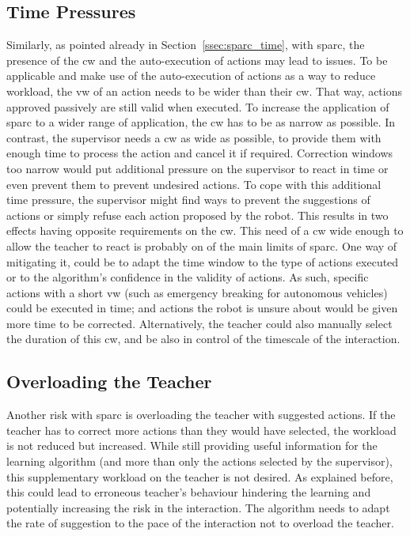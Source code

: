 \subsection{Time Pressures}
Similarly, as pointed already in Section~\ref{ssec:sparc_time}, with \gls{sparc}, the presence of the \gls{cw} and the auto-execution of actions may lead to issues. To be applicable and make use of the auto-execution of actions as a way to reduce workload, the \gls{vw} of an action needs to be wider than their \gls{cw}. That way, actions approved passively are still valid when executed. To increase the application of \gls{sparc} to a wider range of application, the \gls{cw} has to be as narrow as possible. In contrast, the supervisor needs a \gls{cw} as wide as possible, to provide them with enough time to process the action and cancel it if required. Correction windows too narrow would put additional pressure on the supervisor to react in time or even prevent them to prevent undesired actions. To cope with this additional time pressure, the supervisor might find ways to prevent the suggestions of actions or simply refuse each action proposed by the robot. This results in two effects having opposite requirements on the \gls{cw}. This need of a \gls{cw} wide enough to allow the teacher to react is probably on of the main limits of \gls{sparc}. One way of mitigating it, could be to adapt the time window to the type of actions executed or to the algorithm's confidence in the validity of actions. As such, specific actions with a short \gls{vw} (such as emergency breaking for autonomous vehicles) could be executed in time; and actions the robot is unsure about would be given more time to be corrected. Alternatively, the teacher could also manually select the duration of this \gls{cw}, and be also in control of the timescale of the interaction.

\subsection{Overloading the Teacher}
Another risk with \gls{sparc} is overloading the teacher with suggested actions. If the teacher has to correct more actions than they would have selected, the workload is not reduced but increased. While still providing useful information for the learning algorithm (and more than only the actions selected by the supervisor), this supplementary workload on the teacher is not desired. As explained before, this could lead to erroneous teacher's behaviour hindering the learning and potentially increasing the risk in the interaction. The algorithm needs to adapt the rate of suggestion to the pace of the interaction not to overload the teacher.

